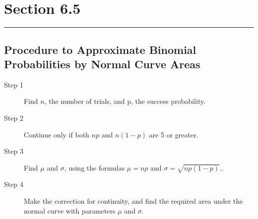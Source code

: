 \documentclass[12pt]{article}
\begin{document}
    \section*{Section 6.5}
    \noindent\rule{\textwidth}{0.4pt}
        \subsection*{Procedure to Approximate Binomial Probabilities by Normal Curve Areas}
            \begin{description}
                \item[Step 1] Find $n$, the number of trials, and p, the success probability.
                \item[Step 2] Continue only if both $np$ and $n(1-p)$ are 5 or greater.
                \item[Step 3] Find $\mu$ and $\sigma$, using the formulas $\mu = np$ and 
                $\sigma = \sqrt{np(1-p)}.$.
                \item[Step 4] Make the correction for continuity, and find the required area
                under the normal curve with parameters $\mu$ and $\sigma$. 
            \end{description}
\end{document}
